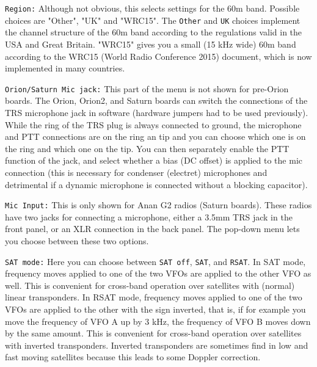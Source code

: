 \documentclass[12pt]{book}
\def\rett#1{\texttt{\color{red}#1}}
\begin{document}
\rett{Region:} Although not obvious, this selects settings for the 60m band. Possible choices are "Other",
 "UK" and "WRC15". The \texttt{Other} and \texttt{UK} choices implement the channel structure of the 60m
 band according to the regulations valid in the USA and Great Britain. "WRC15" gives you a small (15 kHz
 wide) 60m band according to the WRC15 (World Radio Conference 2015) document, which is now implemented in
 many countries.

\rett{Orion/Saturn Mic jack:} This part of the menu is not shown for pre-Orion boards.
The Orion, Orion2, and Saturn boards can switch the connections
 of the TRS microphone jack in software (hardware jumpers had to be used previously).
While the ring of the TRS plug is always connected to ground, the microphone and PTT connections are on the
ring an tip and you can choose which one is on the ring and which one on the tip. You can then separately
enable the PTT function of the jack, and select whether a bias (DC offset) is applied to the mic connection
(this is necessary for condenser (electret) microphones and detrimental if a dynamic microphone is connected without
a blocking capacitor).

\rett{Mic Input:} This is only shown for Anan G2 radios (Saturn boards).
 These radios have two jacks for connecting a
microphone, either a 3.5mm TRS jack in the front panel, or an XLR connection in the back panel. The pop-down
menu lets you choose between these two options.

\rett{SAT mode:} Here you can choose between \texttt{SAT off}, \texttt{SAT}, and \texttt{RSAT}. In SAT mode,
frequency moves applied to one of the two VFOs are applied to the other VFO as well. This is convenient
for cross-band operation over satellites with (normal) linear transponders. In RSAT mode, frequency
moves applied to one of the two VFOs are applied to the other with the sign inverted, that is, if
for example you move the frequency of VFO A up by 3 kHz, the frequency of VFO B moves down by the same
amount. This is convenient for cross-band operation over satellites with inverted transponders. Inverted
transponders are sometimes find in low and fast moving satellites because this leads to some Doppler
 correction.
\end{document}
